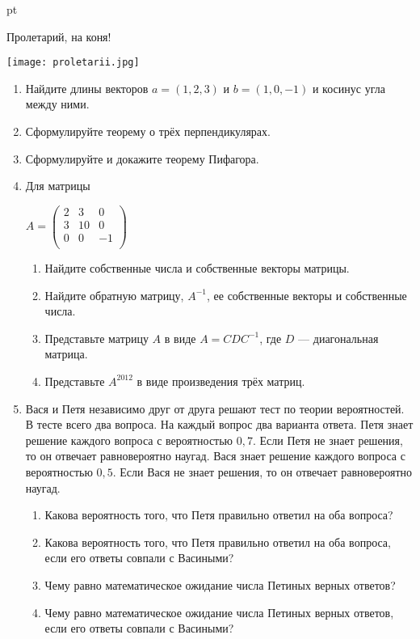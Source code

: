 \documentclass[pdftex,12pt,a4paper]{article}
\begin{document}
 pt %

{\Large Пролетарий, на коня! }
\begin{center}
\texttt{[image: proletarii.jpg]}
\end{center}
\begin{enumerate}
\item Найдите длины векторов $a=(1,2,3)$ и $b=(1,0,-1)$ и косинус угла между ними.
\item Сформулируйте теорему о трёх перпендикулярах.
\item Сформулируйте и докажите теорему Пифагора.
\item Для матрицы 

$A=\left(%
\begin{array}{ccc}
  2 & 3 & 0 \\
  3 & 10 & 0 \\
  0 & 0 & -1 \\
\end{array}%
\right)$ \\

\begin{enumerate}
\item Найдите собственные числа и собственные векторы матрицы.
\item Найдите обратную матрицу, $A^{-1}$, ее собственные векторы и собственные числа.
\item Представьте матрицу $A$ в виде $A=CDC^{-1}$, где $D$ --- диагональная матрица.
\item Представьте $A^{2012}$ в виде произведения трёх матриц.
\end{enumerate}

\item Вася и Петя независимо друг от друга решают тест по теории вероятностей. В тесте всего два вопроса. На каждый вопрос два варианта ответа. Петя знает решение каждого вопроса с вероятностью $0{,}7$. Если Петя не знает решения, то он отвечает равновероятно наугад. Вася знает решение каждого вопроса с вероятностью $0{,}5$. Если Вася не знает решения, то он отвечает равновероятно наугад.
\begin{enumerate}
\item Какова вероятность того, что Петя правильно ответил на оба вопроса?
\item Какова вероятность того, что Петя правильно ответил на оба вопроса, если его ответы совпали с Васиными?
\item Чему равно математическое ожидание числа Петиных верных ответов?
\item Чему равно математическое ожидание числа Петиных верных ответов, если его ответы совпали с Васиными?
\end{enumerate}


\end{enumerate}
\end{document}
